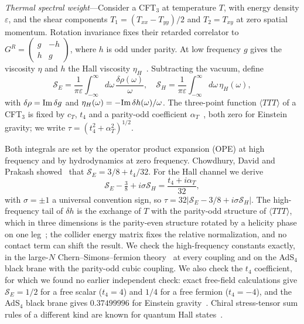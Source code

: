 \documentclass[aps,prl,twocolumn,superscriptaddress,nofootinbib,floatfix]{revtex4-2}
\begin{document}
\textit{Thermal spectral weight}---Consider a CFT$_3$ at temperature $T$, with energy density $\varepsilon$, and the shear
components $T_1=(T_{xx}-T_{yy})/2$ and $T_2=T_{xy}$ at zero spatial momentum. Rotation invariance fixes their retarded correlator
to $G^R=\begin{pmatrix}g&-h\\h&g\end{pmatrix}$, where $h$ is odd under parity. At low frequency $g$ gives the viscosity $\eta$ and
$h$ the Hall viscosity $\eta_H$~\cite{Jensen:2011xb}. Subtracting the vacuum, define
\begin{equation}
\mathcal S_E=\frac1{\pi\varepsilon}\!\int_{-\infty}^{\infty}\!\!d\omega\,\frac{\delta\rho(\omega)}{\omega},\quad
\mathcal S_H=\frac1{\pi\varepsilon}\!\int_{-\infty}^{\infty}\!\!d\omega\,\eta_H(\omega),
\label{eq:SEdef}
\end{equation}
with $\delta\rho={\rm Im}\,\delta g$ and $\eta_H(\omega)=-{\rm Im}\,\delta h(\omega)/\omega$. The three-point function
$\langle TTT\rangle$ of a CFT$_3$ is fixed by $c_T$, $t_4$ and a parity-odd coefficient $\alpha_T$~\cite{HofmanMaldacena,Buchel,CDPrakash,GPY},
both zero for Einstein gravity; we write $\tau=(t_4^2+\alpha_T^2)^{1/2}$.

Both integrals are set by the operator product expansion (OPE) at high frequency and by hydrodynamics at zero frequency.
Chowdhury, David and Prakash showed~\cite{Chowdhury:2016hjy} that $\mathcal S_E=3/8+t_4/32$. For the Hall channel we derive
\begin{equation}
\mathcal S_E-\tfrac38+i\sigma\mathcal S_H=\frac{t_4+i\alpha_T}{32},
\label{eq:SH}
\end{equation}
with $\sigma=\pm1$ a universal convention sign, so $\tau=32|\mathcal S_E-3/8+i\sigma\mathcal S_H|$. The high-frequency tail of
$\delta h$ is the exchange of $T$ with the parity-odd structure of $\langle TTT\rangle$, which in three dimensions is the
parity-even structure rotated by a helicity phase on one leg~\cite{Jain:2021gwa}; the collider energy matrix fixes the relative
normalization, and no contact term can shift the result. We check the high-frequency constants exactly, in the large-$N$
Chern--Simons--fermion theory~\cite{Ghosh:2019sqf} at every coupling and on the AdS$_4$ black brane with the parity-odd cubic
coupling. We also check the $t_4$ coefficient, for which we found no earlier independent check: exact free-field calculations
give $\mathcal S_E=1/2$ for a free scalar ($t_4=4$) and $1/4$ for a free fermion ($t_4=-4$), and the AdS$_4$ black brane gives
$0.37499996$ for Einstein gravity~\cite{SM}. Chiral stress-tensor sum rules of a different kind are known for quantum Hall
states~\cite{Golkar:2013gqa}.
\end{document}
